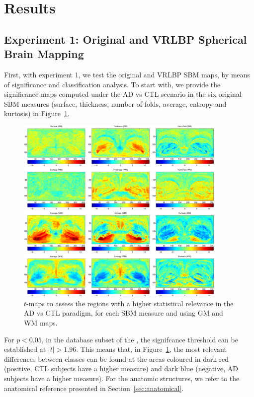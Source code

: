 \section{Results}

\subsection{Experiment 1: Original and \acs{VRLBP} Spherical Brain Mapping}
First, with experiment 1, we test the original and \ac{VRLBP} \ac{SBM} maps, by means of significance and classification analysis. To start with, we provide the significance maps computed under the \ac{AD} vs \ac{CTL} scenario in the six original \ac{SBM} measures (surface, thickness, number of folds, average, entropy and kurtosis) in  Figure~\ref{fig:tmaps}. 

\begin{figure}[htp]
	\myfloatalign
	\includegraphics[width=0.9\textwidth]{Graphics/ch6/07-tmaps}
	\caption[\acs{SBM} t-maps under the \acs{AD} vs \acs{CTL} for \acs{GM} and \acs{WM} images.]{$t$-maps to assess the regions with a higher statistical relevance in the \acs{AD} vs \acs{CTL} paradigm, for each \ac{SBM} measure and using \ac{GM} and \ac{WM} maps. }
	\label{fig:tmaps}
\end{figure}

For $p<0.05$, in the database subset of the \adnimri{}, the signifcance threshold can be established at $|t|>1.96$. This means that, in Figure~\ref{fig:tmaps}, the most relevant differences between classes can be found at the areas coloured in dark red (positive, \ac{CTL} subjects have a higher measure) and dark blue (negative, \ac{AD} subjects have a higher measure). For the anatomic structures, we refer to the anatomical reference presented in Section~\ref{sec:anatomical}. 

